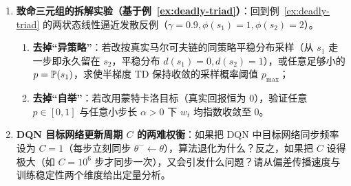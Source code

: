\begin{enumerate}
  \item[\textbf{6.2.5}] \textbf{致命三元组的拆解实验（基于例~\ref{ex:deadly-triad}）}：回到例~\ref{ex:deadly-triad} 的两状态线性逼近发散反例（$\gamma = 0.9, \phi(s_1)=1, \phi(s_2)=2$）。
  \begin{enumerate}
    \item \textbf{去掉“异策略”}：若改按真实马尔可夫链的同策略平稳分布采样（从 $s_1$ 走一步即永久留在 $s_2$，平稳分布 $d(s_1) = 0, d(s_2) = 1$），或任意足够小的 $p = \mathbb{P}(s_1)$，求使半梯度 TD 保持收敛的采样概率阈值 $p_{\max}$；
    \item \textbf{去掉“自举”}：若改用蒙特卡洛目标（真实回报恒为 $0$），验证任意 $p \in [0, 1]$ 与任意小步长 $\alpha > 0$ 下 $w_t$ 均指数收敛至 $0$。
  \end{enumerate}

  \item[\textbf{6.2.6}] \textbf{DQN 目标网络更新周期 $C$ 的两难权衡}：如果把 DQN 中目标网络同步频率设为 $C = 1$（每步立刻同步 $\theta^- \leftarrow \theta$），算法退化为什么？反之，如果把 $C$ 设得极大（如 $C = 10^6$ 步才同步一次），又会引发什么问题？请从偏差传播速度与训练稳定性两个维度给出定量分析。
\end{enumerate}


